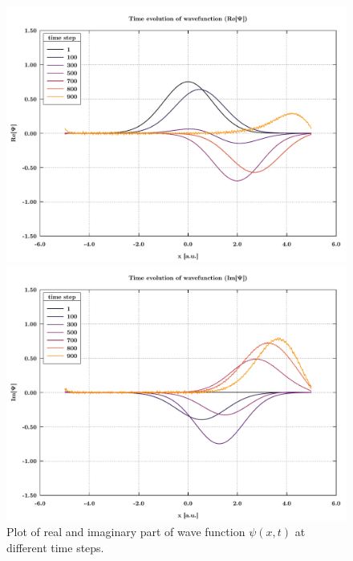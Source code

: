 \documentclass[rmp,10pt,onecolumn,fleqn,notitlepage]{revtex4-1}
\begin{document}
\begin{figure}[h!]
\begin{minipage}[c]{0.48\linewidth}
\centering
\includegraphics[width=1\textwidth]{image/state_re.pdf}
\end{minipage}
\begin{minipage}[]{0.48\linewidth}
\centering
\includegraphics[width=1\textwidth]{image/state_im.pdf}
\end{minipage}
\caption{\label{fig:result_state} Plot of real and imaginary part of wave function \( \psi(x,t) \) at different time steps.}
\end{figure}
\end{document}
